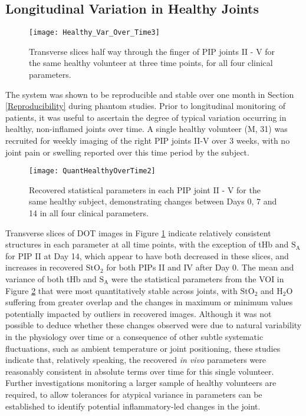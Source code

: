\documentclass[twoside]{bhamthesis}
\theoremstyle{definition}
\begin{document}
\subsection{Longitudinal Variation in Healthy Joints}
\label{Longitudinal Variation in Healthy Joints}

\begin{figure}[!ht]
\centering\texttt{[image: Healthy\_Var\_Over\_Time3]}
\caption{Transverse slices half way through the finger of PIP joints II - V for the same healthy volunteer at three time points, for all four clinical parameters.}
\label{Healthy_Var_Over_Time2}
\end{figure}

The system was shown to be reproducible and stable over one month in Section 
\ref{Reproducibility} during phantom studies. Prior to longitudinal monitoring of patients, it was useful to ascertain the degree of typical variation occurring in healthy, non-inflamed joints over time. A single healthy volunteer (M, 31) was recruited for weekly imaging of the right PIP joints II-V over 3 weeks, with no joint pain or swelling reported over this time period by the subject. 

\begin{figure}[!ht]
\centering\texttt{[image: QuantHealthyOverTime2]}
\caption{Recovered statistical parameters in each PIP joint II - V for the same healthy subject, demonstrating changes between Days 0, 7 and 14 in all four clinical parameters.}
\label{QuantHealthyOverTime}
\end{figure}

Transverse slices of DOT images in Figure 
\ref{Healthy_Var_Over_Time2} indicate relatively consistent structures in each parameter at all time points, with the exception of tHb and $\mathrm{S_A}$ for PIP II at Day 14, which appear to have both decreased in these slices, and increases in recovered $\mathrm{StO_2}$ for both PIPs II and IV after Day 0. The mean and variance of both tHb and $\mathrm{S_A}$ were the statistical parameters from the VOI in Figure \ref{QuantHealthyOverTime} that were most quantitatively stable across joints, with $\mathrm{StO_2}$ and $\mathrm{H_2O}$ suffering from greater overlap and the changes in maximum or minimum values potentially impacted by outliers in recovered images. Although it was not possible to deduce whether these changes observed were due to natural variability in the physiology over time or a consequence of other subtle systematic fluctuations, such as ambient temperature or joint positioning, these studies indicate that, relatively speaking, the recovered \textit{in vivo} parameters were reasonably consistent in absolute terms over time for this single volunteer. Further investigations monitoring a larger sample of healthy volunteers are required, to allow tolerances for atypical variance in parameters can be established to identify potential inflammatory-led changes in the joint.
\end{document}

